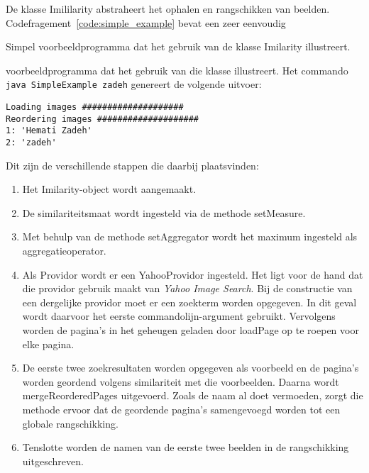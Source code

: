 De klasse {\klassefont Imililarity} abstraheert het ophalen en rangschikken van
beelden. Codefragement~\ref{code:simple_example} bevat een zeer eenvoudig 
\begin{code}[bp]
\vspace{5pt}
\begin{lgrind}

\end{lgrind}
\vspace{5pt}
\caption{\label{code:simple_example}Simpel voorbeeldprogramma dat het gebruik van
de klasse {\klassefont Imilarity} illustreert.}
\end{code}
voorbeeldprogramma dat het gebruik van die klasse illustreert. Het commando
\texttt{java SimpleExample zadeh} genereert de volgende uitvoer:
\begin{verbatim}
Loading images ####################
Reordering images ####################
1: 'Hemati Zadeh'
2: 'zadeh'
\end{verbatim} 
Dit zijn de verschillende stappen die daarbij plaatsvinden:
\begin{enumerate}
  \item Het {\klassefont Imilarity}-object wordt aangemaakt.
  \item De similariteitsmaat wordt ingesteld via de methode {\klassefont setMeasure}.
  \item Met behulp van de methode {\klassefont setAggregator} wordt het maximum ingesteld als
		aggregatieoperator. 
  \item Als {\klassefont Providor} wordt er een {\klassefont YahooProvidor} ingesteld.
  	    Het ligt voor de hand dat die providor gebruik maakt van
  	    \emph{Yahoo Image Search}. Bij de constructie van een dergelijke providor
  	    moet er een zoekterm worden opgegeven. In dit geval wordt daarvoor het eerste 
  	    commandolijn-argument gebruikt. Vervolgens worden de pagina's in 
  	    het geheugen geladen door {\klassefont loadPage} op te roepen voor elke pagina.
  \item De eerste twee zoekresultaten worden opgegeven als voorbeeld en de pagina's
        worden geordend volgens similariteit met die voorbeelden. Daarna wordt
        {\klassefont mergeReorderedPages} uitgevoerd. Zoals de naam al doet vermoeden,
        zorgt die methode ervoor dat de geordende pagina's samengevoegd 
        worden tot een globale rangschikking.
  \item Tenslotte worden de namen van de eerste twee beelden in de rangschikking 
  	    uitgeschreven.
\end{enumerate}

